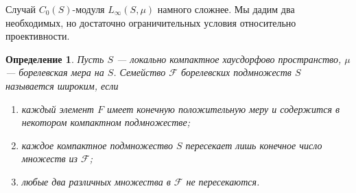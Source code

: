 \documentclass[12pt]{article}
\newtheorem{definition}[theorem]{Определение}
\begin{document}
Случай $C_0(S)$-модуля $L_\infty(S,\mu)$ намного сложнее. Мы дадим два
необходимых, но достаточно ограничительных условия относительно проективности.

\begin{definition}\label{WideFamilyDef} Пусть $S$ --- локально компактное
    хаусдорфово пространство, $\mu$ --- борелевская мера на $S$. Семейство
    $\mathcal{F}$ борелевских подмножеств $S$ называется широким, если
    \begin{enumerate}[label = (\roman*)]
        \item каждый элемент $F$ имеет конечную положительную меру и содержится
              в некотором компактном подмножестве;

        \item каждое компактное подмножество $S$ пересекает лишь конечное число
              множеств из $\mathcal{F}$;

        \item любые два различных множества в $\mathcal{F}$ не пересекаются.
    \end{enumerate}
\end{definition}
\end{document}
